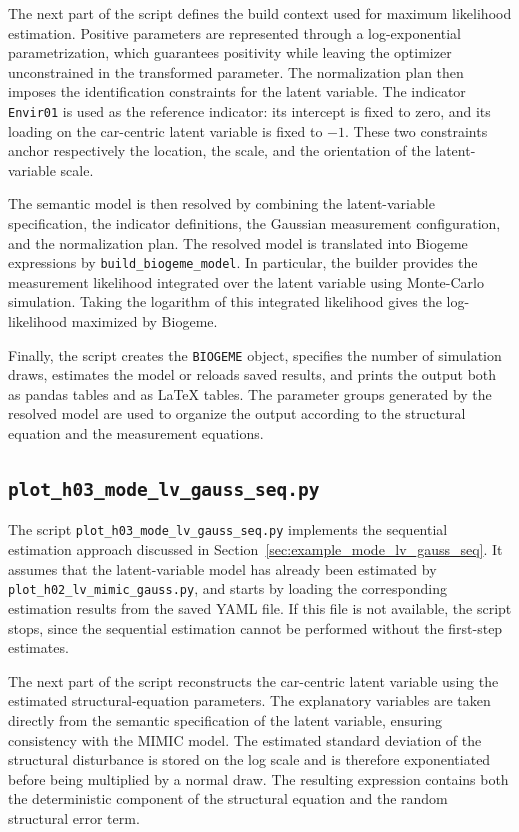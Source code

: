 \documentclass[12pt,a4paper]{article}
\begin{document}
The next part of the script defines the build context used for maximum
likelihood estimation. Positive parameters are represented through a
log-exponential parametrization, which guarantees positivity while
leaving the optimizer unconstrained in the transformed parameter. The
normalization plan then imposes the identification constraints for the
latent variable. The indicator \lstinline$Envir01$ is used as the
reference indicator: its intercept is fixed to zero, and its loading
on the car-centric latent variable is fixed to \(-1\). These two
constraints anchor respectively the location, the scale, and the
orientation of the latent-variable scale.

The semantic model is then resolved by combining the latent-variable
specification, the indicator definitions, the Gaussian measurement
configuration, and the normalization plan. The resolved model is
translated into Biogeme expressions by
\lstinline$build_biogeme_model$. In particular, the builder provides
the measurement likelihood integrated over the latent variable using
Monte-Carlo simulation. Taking the logarithm of this integrated
likelihood gives the log-likelihood maximized by Biogeme.

Finally, the script creates the \lstinline$BIOGEME$ object, specifies
the number of simulation draws, estimates the model or reloads saved
results, and prints the output both as pandas tables and as LaTeX
tables. The parameter groups generated by the resolved model are used
to organize the output according to the structural equation and the
measurement equations.

\subsection{\lstinline$plot_h03_mode_lv_gauss_seq.py$}
\label{sec:plot_h03_mode_lv_gauss_seq.py}


The script \lstinline$plot_h03_mode_lv_gauss_seq.py$ implements the
sequential estimation approach discussed in
Section~\ref{sec:example_mode_lv_gauss_seq}. It assumes that the
latent-variable model has already been estimated by
\lstinline$plot_h02_lv_mimic_gauss.py$, and starts by loading the
corresponding estimation results from the saved YAML file. If this
file is not available, the script stops, since the sequential
estimation cannot be performed without the first-step estimates.

The next part of the script reconstructs the car-centric latent
variable using the estimated structural-equation parameters. The
explanatory variables are taken directly from the semantic
specification of the latent variable, ensuring consistency with the
MIMIC model. The estimated standard deviation of the structural
disturbance is stored on the log scale and is therefore exponentiated
before being multiplied by a normal draw. The resulting expression
contains both the deterministic component of the structural equation
and the random structural error term.
\end{document}

